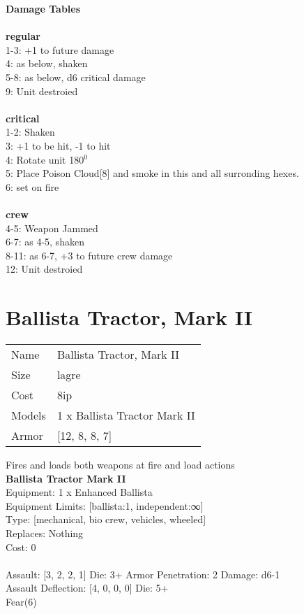 {\bf Damage Tables} \\
\ \\ {\bf regular } \\
1-3: +1 to future damage \\
4: as below, shaken \\
5-8: as below, d6 critical damage \\
9: Unit destroied \\
\ \\ {\bf critical } \\
1-2: Shaken \\
3: +1 to be hit, -1 to hit \\
4: Rotate unit 180$^0$ \\
5: Place Poison Cloud[8] and smoke in this and all surronding hexes. \\
6: set on fire \\
\ \\ {\bf crew } \\
4-5: Weapon Jammed \\
6-7: as 4-5, shaken \\
8-11: as 6-7, +3 to future crew damage \\
12: Unit destroied \\










\pagebreak\pagebreak

\section{ Ballista Tractor, Mark II }

\begin{tabular}{ll}
  Name & Ballista Tractor, Mark II \\
  Size & lagre\\
  Cost & 8ip\\
  Models & 1 x Ballista Tractor Mark II\\
  Armor & [12, 8, 8, 7]\\
\end{tabular}

\noindent Fires and loads both weapons at fire and load actions\\ 


{\bf Ballista Tractor Mark II } \\
Equipment: 1 x Enhanced Ballista \\
Equipment Limits: [ballista:1, independent:∞] \\
Type: [mechanical, bio crew, vehicles, wheeled] \\
Replaces: Nothing \\
Cost: 0\\
\ \\
Assault: [3, 2, 2, 1] Die: 3+ Armor Penetration: 2 Damage: d6-1 \\
Assault Deflection: [4, 0, 0, 0] Die: 5+\\
\indent Fear(6)\\ 
 

